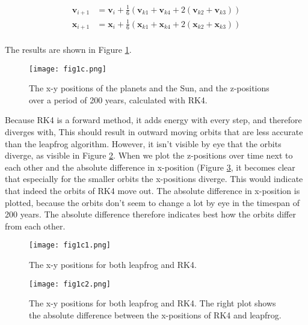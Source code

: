 \begin{align}
    \mathbf{v}_{i+1} &= \mathbf{v}_{i} + \frac{1}{6} (\mathbf{v}_{k1} + \mathbf{v}_{k4} + 2(\mathbf{v}_{k2} + \mathbf{v}_{k3})) \\
    \mathbf{x}_{i+1} &= \mathbf{x}_{i} + \frac{1}{6} (\mathbf{x}_{k1} + \mathbf{x}_{k4} + 2(\mathbf{x}_{k2} + \mathbf{x}_{k3})) \\
\end{align}

The results are shown in Figure \ref{fig:1c}.
\begin{figure}[h!]
  \centering
  \texttt{[image: fig1c.png]}
  \caption{The x-y positions of the planets and the Sun, and the z-positions over a period of 200 years, calculated with RK4.}
  \label{fig:1c}
\end{figure}

Because RK4 is a forward method, it adds energy with every step, and therefore diverges with, This should result in outward moving orbits that are less accurate than the leapfrog algorithm. However, it isn't visible by eye that the orbits diverge, as visible in  Figure \ref{fig:1c1}. When we plot the z-positions over time next to each other and the absolute difference in x-position (Figure \ref{fig:1c2}, it becomes clear that especially for the smaller orbits the x-positions diverge. This would indicate that indeed the orbits of RK4 move out. The absolute difference in x-position is plotted, because the orbits don't seem to change a lot by eye in the timespan of 200 years. The absolute difference therefore indicates best how the orbits differ from each other. 
\begin{figure}[h!]
  \centering
  \texttt{[image: fig1c1.png]}
  \caption{The x-y positions for both leapfrog and RK4.}
  \label{fig:1c1}
\end{figure}

\begin{figure}[h!]
  \centering
  \texttt{[image: fig1c2.png]}
  \caption{The x-y positions for both leapfrog and RK4. The right plot shows the absolute difference between the x-positions of RK4 and leapfrog.}
  \label{fig:1c2}
\end{figure}
